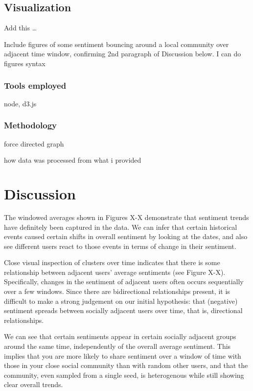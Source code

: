 \documentclass[11pt]{article}
\begin{document}
\subsection{Visualization}
Add this \dots\newline

Include figures of some sentiment bouncing around a local community over adjacent time window, confirming 2nd paragraph of Discussion below. I can do figures syntax

\subsubsection{Tools employed}
node, d3.js

\subsubsection{Methodology}
force directed graph\newline

how data was processed from what i provided


\section{Discussion}
The windowed averages shown in Figures X-X demonstrate that sentiment trends have definitely been captured in the data. We can infer that certain historical events caused certain shifts in overall sentiment by looking at the dates, and also see different users react to those events in terms of change in their sentiment.\newline

Close visual inspection of clusters over time indicates that there is some relationship between adjacent users' average sentiments (see Figure X-X). Specifically, changes in the sentiment of adjacent users often occurs sequentially over a few windows. Since there are bidirectional relationships present, it is difficult to make a strong judgement on our initial hypothesis: that (negative) sentiment spreads between socially adjacent users over time, that is, directional relationships.\newline

We can see that certain sentiments appear in certain socially adjacent groups around the same time, independently of the overall average sentiment. This implies that you are more likely to share sentiment over a window of time with those in your close social community than with random other users, and that the community, even sampled from a single seed, is heterogenous while still showing clear overall trends.\newline
\end{document}
